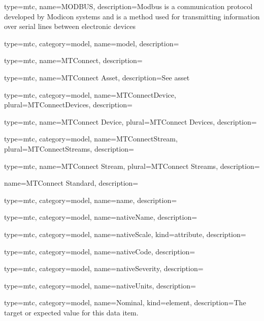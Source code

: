 {
  type=mtc,
  name=MODBUS,
  description={Modbus is a communication protocol developed by Modicon systems and is a method used for transmitting information over serial lines between electronic devices}
}


{
  type=mtc,
  category=model,
  name={model},
  description={}
}


{
  type=mtc,
  name={MTConnect},
  description={}
}


{
  type=mtc,
  name={MTConnect Asset},
  description={See \gls{asset}}
}


{
  type=mtc,
  category=model,
  name={MTConnectDevice},
  plural={MTConnectDevices},
  description={}
}


{
  type=mtc,
  name={MTConnect Device},
  plural={MTConnect Devices},
  description={}
}


{
  type=mtc,
  category=model,
  name={MTConnectStream},
  plural={MTConnectStreams},
  description={}
}


{
  type=mtc,
  name={MTConnect Stream},
  plural={MTConnect Streams},
  description={}
}


{
  name={MTConnect Standard},
  description={}
}


{
  type=mtc,
  category=model,
  name={name},
  description={}
}


{
  type=mtc,
  category=model,
  name={nativeName},
  description={}
}


{
  type=mtc,
  category=model,
  name={nativeScale},
  kind={attribute},
  description={}
}


{
  type=mtc,
  category=model,
  name={nativeCode},
  description={}
}


{
  type=mtc,
  category=model,
  name={nativeSeverity},
  description={}
}


{
  type=mtc,
  category=model,
  name={nativeUnits},
  description={}
}



{
  type=mtc,
  category=model,
  name={Nominal},
  kind={element},
  description={The target or expected value for this data item.}
}


